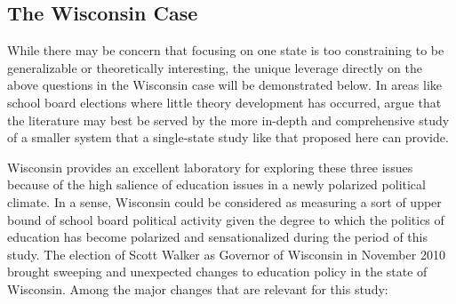 \subsection{The Wisconsin Case}

While there may be concern that focusing on one state is too constraining to be 
generalizable or theoretically interesting, the unique leverage directly on the 
above questions in the Wisconsin case will be demonstrated below. In areas like 
school board elections where little theory development has occurred, 
\citet{RefWorks:192} argue that the literature may best be served by the more 
in-depth and comprehensive study of a smaller system that a single-state study 
like that proposed here can provide. 

Wisconsin provides an excellent laboratory for exploring these three issues because 
of the high salience of education issues in a newly polarized political climate. 
In a sense, Wisconsin could be considered as measuring a sort of upper bound of 
school board political activity given the degree to which the politics of education 
has become polarized and sensationalized during the period of this study. 
The election of Scott Walker as Governor of Wisconsin in November 2010 brought 
sweeping and unexpected changes to education policy in the state of Wisconsin. Among 
the major changes that are relevant for this study:
\vspace{-12pt} %
